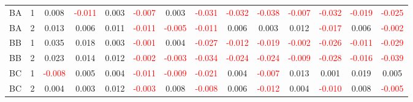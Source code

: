 \begin{table}[H]
{\begin{tabular}{llcccccccccccc}
BA & 1 & 0.008 & \textcolor{red}{-0.011} & 0.003 & \textcolor{red}{-0.007} & 0.003 & \textcolor{red}{-0.031} & \textcolor{red}{-0.032} & \textcolor{red}{-0.038} & \textcolor{red}{-0.007} & \textcolor{red}{-0.032} & \textcolor{red}{-0.019} & \textcolor{red}{-0.025}\\
BA & 2 & 0.013 & 0.006 & 0.011 & \textcolor{red}{-0.011} & \textcolor{red}{-0.005} & \textcolor{red}{-0.011} & 0.006 & 0.003 & 0.012 & \textcolor{red}{-0.017} & 0.006 & \textcolor{red}{-0.002}\\
BB & 1 & 0.035 & 0.018 & 0.003 & \textcolor{red}{-0.001} & 0.004 & \textcolor{red}{-0.027} & \textcolor{red}{-0.012} & \textcolor{red}{-0.019} & \textcolor{red}{-0.002} & \textcolor{red}{-0.026} & \textcolor{red}{-0.011} & \textcolor{red}{-0.029}\\
BB & 2 & 0.023 & 0.014 & 0.012 & \textcolor{red}{-0.002} & \textcolor{red}{-0.003} & \textcolor{red}{-0.034} & \textcolor{red}{-0.024} & \textcolor{red}{-0.024} & \textcolor{red}{-0.009} & \textcolor{red}{-0.028} & \textcolor{red}{-0.016} & \textcolor{red}{-0.039}\\
BC & 1 & \textcolor{red}{-0.008} & 0.005 & 0.004 & \textcolor{red}{-0.011} & \textcolor{red}{-0.009} & \textcolor{red}{-0.021} & 0.004 & \textcolor{red}{-0.007} & 0.013 & 0.001 & 0.019 & 0.005\\
BC & 2 & 0.004 & 0.003 & 0.012 & \textcolor{red}{-0.003} & 0.008 & \textcolor{red}{-0.008} & 0.006 & \textcolor{red}{-0.012} & 0.004 & \textcolor{red}{-0.010} & 0.008 & \textcolor{red}{-0.005}\\
\hline
    \end{tabular}%
    }
    \label{tab:cen2_cov}
\end{table}


